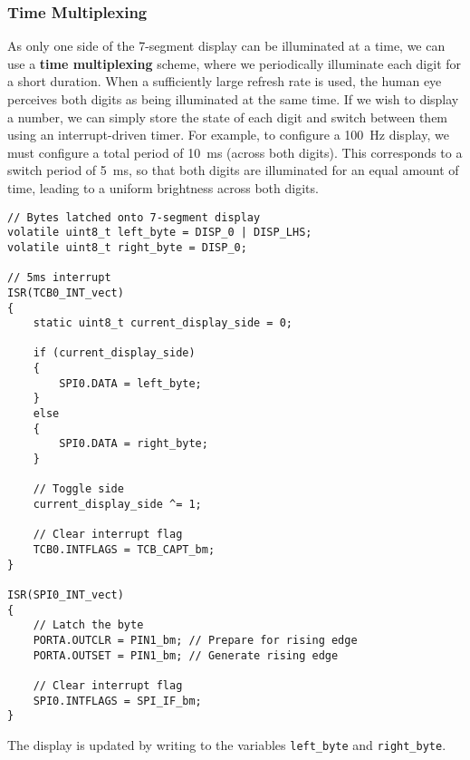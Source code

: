 \documentclass{article}
\begin{document}
\subsubsection{Time Multiplexing}
As only one side of the 7-segment display can be illuminated at a time,
we can use a \textbf{time multiplexing} scheme, where we periodically
illuminate each digit for a short duration. When a sufficiently large
refresh rate is used, the human eye perceives both digits as being
illuminated at the same time. If we wish to display a number, we can
simply store the state of each digit and switch between them using an
interrupt-driven timer. For example, to configure a \qty{100}{\hertz}
display, we must configure a total period of \qty{10}{ms} (across both
digits). This corresponds to a switch period of \qty{5}{ms}, so that
both digits are illuminated for an equal amount of time, leading to a
uniform brightness across both digits.
\begin{verbatim}
// Bytes latched onto 7-segment display
volatile uint8_t left_byte = DISP_0 | DISP_LHS;
volatile uint8_t right_byte = DISP_0;

// 5ms interrupt
ISR(TCB0_INT_vect)
{
    static uint8_t current_display_side = 0;

    if (current_display_side)
    {
        SPI0.DATA = left_byte;
    }
    else
    {
        SPI0.DATA = right_byte;
    }

    // Toggle side
    current_display_side ^= 1;

    // Clear interrupt flag
    TCB0.INTFLAGS = TCB_CAPT_bm;
}

ISR(SPI0_INT_vect)
{
    // Latch the byte
    PORTA.OUTCLR = PIN1_bm; // Prepare for rising edge
    PORTA.OUTSET = PIN1_bm; // Generate rising edge

    // Clear interrupt flag
    SPI0.INTFLAGS = SPI_IF_bm;
}
\end{verbatim}
The display is updated by writing to the variables
\texttt{left_byte} and \texttt{right_byte}.
\end{document}
